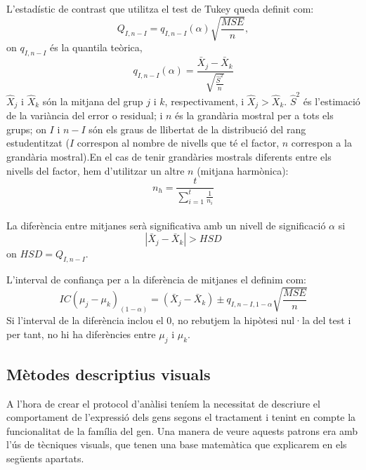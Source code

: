 \documentclass[english]{article}
\begin{document}
L'estadístic de contrast que utilitza el test de Tukey queda definit com:
\begin{equation*}
Q_{I,n-I} = q_{I,n-I}(\alpha)\sqrt{\frac{MSE}{n}} ,
\end{equation*}
on $q_{I,n-I}$ és la quantila teòrica,
\begin{equation*}
q_{I,n-I}(\alpha) = \frac{\bar{X}_j - \bar{X}_k}{\sqrt{\frac{\hat{S}^2}{n}}}
\end{equation*}
$\hat{X}_j$ i $\hat{X}_k$ són la mitjana del grup $j$ i $k$, respectivament, i $\hat{X}_j > \hat{X}_k$. $\hat{S}^2$ és l'estimació de la variància del error o residual; i $n$ és la grandària mostral per a tots els grups; on $I$ i $n-I$ són els graus de llibertat de la distribució del rang estudentitzat ($I$ correspon al nombre de nivells que té el factor, $n$ correspon a la grandària mostral).En el cas de tenir grandàries mostrals diferents entre els nivells del factor, hem d'utilitzar un altre $n$ (mitjana harmònica):
\begin{equation*}
n_h = \frac{t}{\sum_{i=1}^{t}\frac{1}{n_i}}
\end{equation*}
\\

La diferència entre mitjanes serà significativa amb un nivell de significació $\alpha$ si
\begin{equation*}
|\bar{X}_j - \bar{X}_k |> HSD
\end{equation*}
on $HSD=Q_{I,n-I}$.

L'interval de confian\c{c}a per a la diferència de mitjanes el definim com:
\begin{equation*}
IC(\mu_j - \mu_k)_{(1-\alpha)}= (\bar{X}_j - \bar{X}_k) \pm q_{I,n-I,1-\alpha}\sqrt{\frac{MSE}{n}}
\end{equation*}
Si l'interval de la diferència inclou el 0, no rebutjem la hipòtesi nul·la del test i per tant, no hi ha diferències entre $\mu_j$ i $\mu_k$.
\subsection{Mètodes descriptius visuals}
\label{2.4}
A l'hora de crear el protocol d'anàlisi teníem la necessitat de descriure el comportament de l'expressió dels gens segons el tractament i tenint en compte la funcionalitat de la família del gen. Una manera de veure aquests patrons era amb l'ús de tècniques visuals, que tenen una base matemàtica que explicarem en els següents apartats.
\end{document}
